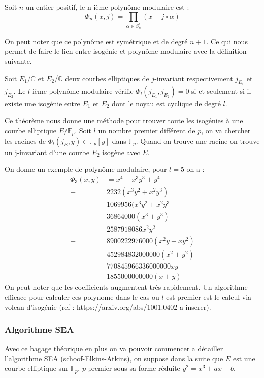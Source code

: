\documentclass{article}
\begin{document}
\begin{defi}
Soit $n$ un entier positif, le n-ième polynôme modulaire est :
\begin{equation*}
\Phi_n(x,j) = \prod_{\alpha \in S_n^*} (x - j \circ \alpha)
\end{equation*}
\end{defi}
On peut noter que ce polynôme est symétrique et de degré $n+1$.
Ce qui nous permet de faire le lien entre isogénie et polynôme modulaire avec la définition suivante.
\begin{defi}
Soit $E_1$/$\mathbb{C}$ et $E_2$/$\mathbb{C}$ deux courbes elliptiques de $j$-invariant respectivement $j_{E_1}$ et $j_{E_2}$. Le $l$-ième polynôme modulaire vérifie $\Phi_l(j_{E_1},j_{E_2}) = 0$ si et seulement si il existe une isogénie entre $E_1$ et $E_2$ dont le noyau est cyclique de degré $l$.
\end{defi}

Ce théorème nous donne une méthode pour trouver toute les isogénies à une courbe elliptique $E$/$\mathbb{F}_p$. Soit $l$ un nombre premier différent de $p$, on va chercher les racines de $\Phi_l(j_E, y) \in \mathbb{F}_p[y]$ dans $\mathbb{F}_p$. Quand on trouve une racine on trouve un j-invariant d'une courbe $E_2$ isogène avec $E$. 

On donne un exemple de polynôme modulaire, pour $ l =5$ on a :
\begin{align*}
\Phi_3(x,y) &= x^4 -x^3y^3 + y^4 \\
 +& 2232(x^3y^2 + x^2y^3) \\
 -& 1069956(x^3y^2 + x^2y^3 \\
 +& 36864000(x^3 + y^3) \\
 +& 2587918086x^2y^2 \\
 +& 8900222976000(x^2y + xy^2) \\
 +& 452984832000000(x^2 + y^2) \\
 -& 770845966336000000xy \\
 +& 1855000000000(x+y) 
\end{align*}
On peut noter que les coefficients augmentent très rapidement. Un algorithme efficace pour calculer ces polynome dans le cas ou $l$ est premier est le calcul via volcan d'isogénie (ref : https://arxiv.org/abs/1001.0402 a inserer).

\subsubsection{Algorithme SEA}
Avec ce bagage théorique en plus on va pouvoir commencer a détailler l'algorithme SEA (schoof-Elkins-Atkins), on suppose dans la suite que $E$ est une courbe elliptique sur $\mathbb{F}_p$, $p$ premier sous sa forme réduite $y^2 = x^3 + ax +b$.
\end{document}
